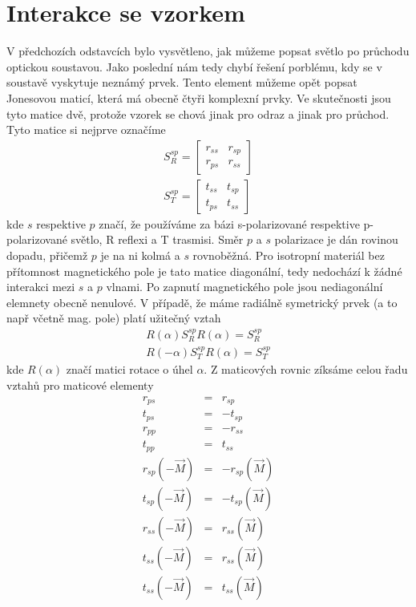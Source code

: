 \section{Interakce se vzorkem}
V předchozích odstavcích bylo vysvětleno, jak můžeme popsat světlo po průchodu optickou soustavou. Jako poslední nám tedy chybí řešení porblému, kdy se v soustavě vyskytuje neznámý prvek. Tento element můžeme opět popsat Jonesovou maticí, která má obecně čtyři komplexní prvky. Ve skutečnosti jsou tyto matice dvě, protože vzorek se chová jinak pro odraz a jinak pro průchod. Tyto matice si nejprve označíme
\begin{eqnarray}
S^{sp}_R = \begin{bmatrix} r_{ss} & r_{sp} \\ r_{ps} & r_{ss} \end{bmatrix} \\
S^{sp}_T = \begin{bmatrix} t_{ss} & t_{sp} \\ t_{ps} & t_{ss} \end{bmatrix} 
\end{eqnarray}
kde $s$ respektive $p$ značí, že používáme za bázi s-polarizované respektive p-polarizované světlo, R  reflexi a T trasmisi. Směr $p$ a $s$ polarizace je dán rovinou dopadu, přičemž $p$ je na ni kolmá a $s$ rovnoběžná. Pro isotropní materiál bez přítomnost magnetického pole je tato matice diagonální, tedy nedochází k žádné interakci mezi $s$ a $p$ vlnami. Po zapnutí magnetického pole jsou nediagonální elemnety obecně nenulové. V případě, že máme radiálně symetrický prvek (a to např včetně mag. pole) platí užitečný vztah
\begin{eqnarray}
R(\alpha)S^{sp}_RR(\alpha)=S^{sp}_R \\
R(-\alpha)S^{sp}_TR(\alpha)=S^{sp}_T
\end{eqnarray}
kde $R(\alpha)$ značí matici rotace o úhel $\alpha$.
Z maticových rovnic zíksáme celou řadu vztahů pro maticové elementy
\begin{eqnarray}
r_{ps}&=&r_{sp} \\
t_{ps}&=&-t_{sp} \\
r_{pp}&=&-r_{ss} \\
t_{pp}&=&t_{ss} \\
r_{sp}(-\vec{M})&=&-r_{sp}(\vec{M}) \\
t_{sp}(-\vec{M})&=&-t_{sp}(\vec{M}) \\
r_{ss}(-\vec{M})&=&r_{ss}(\vec{M}) \\
t_{ss}(-\vec{M})&=&r_{ss}(\vec{M}) \\
t_{ss}(-\vec{M})&=&t_{ss}(\vec{M})
\end{eqnarray}
